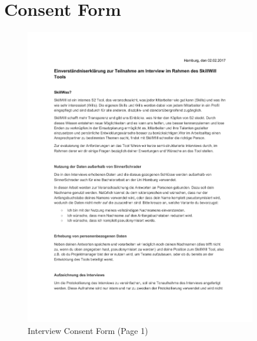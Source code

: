 \section{Consent Form}
\label{consentform}
\begin{figure}[!h]
    \centering
    \includegraphics[width=0.9\textwidth,page=1]{images/Interview_Consent.pdf}
    \caption[Interview Consent Form]{Interview Consent Form (Page 1)}
\end{figure}

